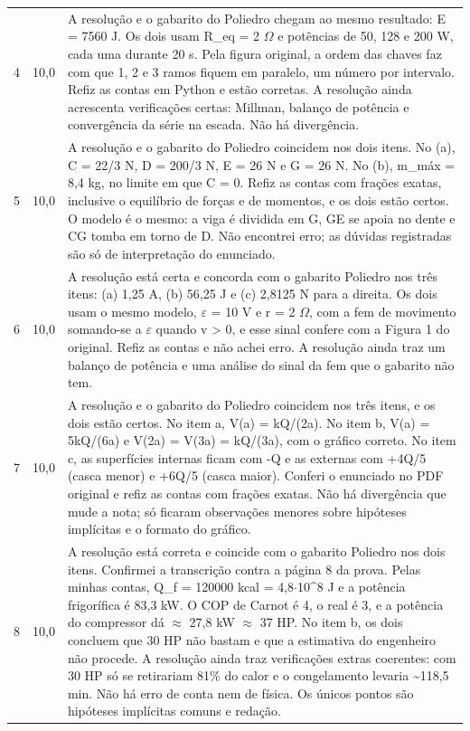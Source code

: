 \documentclass{article}%
\begin{document}
\begin{longtable}{@{}c c p{}@{}}
4 & 10,0 & A resolução e o gabarito do Poliedro chegam ao mesmo resultado: E = 7560 J. Os dois usam R\_eq = 2 $\Omega$ e potências de 50, 128 e 200 W, cada uma durante 20 s. Pela figura original, a ordem das chaves faz com que 1, 2 e 3 ramos fiquem em paralelo, um número por intervalo. Refiz as contas em Python e estão corretas. A resolução ainda acrescenta verificações certas: Millman, balanço de potência e convergência da série na escada. Não há divergência. \\
5 & 10,0 & A resolução e o gabarito do Poliedro coincidem nos dois itens. No (a), C = 22/3 N, D = 200/3 N, E = 26 N e G = 26 N. No (b), m\_máx = 8,4 kg, no limite em que C = 0. Refiz as contas com frações exatas, inclusive o equilíbrio de forças e de momentos, e os dois estão certos. O modelo é o mesmo: a viga é dividida em G, GE se apoia no dente e CG tomba em torno de D. Não encontrei erro; as dúvidas registradas são só de interpretação do enunciado. \\
6 & 10,0 & A resolução está certa e concorda com o gabarito Poliedro nos três itens: (a) 1,25 A, (b) 56,25 J e (c) 2,8125 N para a direita. Os dois usam o mesmo modelo, $\varepsilon$ = 10 V e r = 2 $\Omega$, com a fem de movimento somando{-}se a $\varepsilon$ quando v > 0, e esse sinal confere com a Figura 1 do original. Refiz as contas e não achei erro. A resolução ainda traz um balanço de potência e uma análise do sinal da fem que o gabarito não tem. \\
7 & 10,0 & A resolução e o gabarito do Poliedro coincidem nos três itens, e os dois estão certos. No item a, V(a) = kQ/(2a). No item b, V(a) = 5kQ/(6a) e V(2a) = V(3a) = kQ/(3a), com o gráfico correto. No item c, as superfícies internas ficam com -Q e as externas com +4Q/5 (casca menor) e +6Q/5 (casca maior). Conferi o enunciado no PDF original e refiz as contas com frações exatas. Não há divergência que mude a nota; só ficaram observações menores sobre hipóteses implícitas e o formato do gráfico. \\
8 & 10,0 & A resolução está correta e coincide com o gabarito Poliedro nos dois itens. Confirmei a transcrição contra a página 8 da prova. Pelas minhas contas, Q\_f = 120000 kcal = 4,8$\cdot$10\^{}8 J e a potência frigorífica é 83,3 kW. O COP de Carnot é 4, o real é 3, e a potência do compressor dá $\approx$ 27,8 kW $\approx$ 37 HP. No item b, os dois concluem que 30 HP não bastam e que a estimativa do engenheiro não procede. A resolução ainda traz verificações extras coerentes: com 30 HP só se retirariam 81\% do calor e o congelamento levaria \textasciitilde{}118,5 min. Não há erro de conta nem de física. Os únicos pontos são hipóteses implícitas comuns e redação. \\

\end{longtable}
\end{document}
